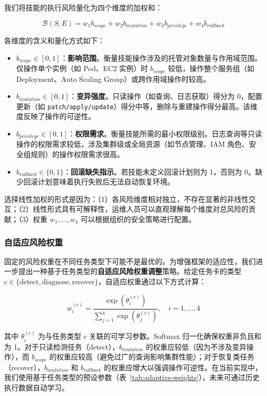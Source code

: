 \documentclass[11pt,a4paper]{ctexart}
\begin{document}
我们将技能的执行风险量化为四个维度的加权和：

\begin{equation}
\mathcal{B}(S, E) = w_1 b_{scope} + w_2 b_{mutation} + w_3 b_{privilege} + w_4 b_{rollback}
\end{equation}

\noindent 各维度的含义和量化方式如下：
\begin{itemize}[leftmargin=2em]
  \item $b_{scope} \in [0, 1]$：\textbf{影响范围}。衡量技能操作涉及的托管对象数量与作用域范围。仅操作单个实例（如 Pod、EC2 实例）时 $b_{scope}$ 较低，操作整个服务组（如 Deployment、Auto Scaling Group）或跨作用域操作时较高。
  \item $b_{mutation} \in [0, 1]$：\textbf{变异强度}。只读操作（如查询、日志获取）得分为 0，配置更新（如 \texttt{patch/apply/update}）得分中等，删除与重建操作得分最高。该维度反映了操作的可逆性。
  \item $b_{privilege} \in [0, 1]$：\textbf{权限需求}。衡量技能所需的最小权限级别。日志查询等只读操作的权限需求较低，涉及集群级或全局资源（如节点管理、IAM 角色、安全组规则）的操作权限需求很高。
  \item $b_{rollback} \in \{0, 1\}$：\textbf{回滚缺失指示}。若技能未定义回滚计划则为 1，否则为 0。缺少回滚计划意味着执行失败后无法自动恢复环境。
\end{itemize}

\noindent 选择线性加权的形式是因为：（1）各风险维度相对独立，不存在显著的非线性交互；（2）线性形式具有可解释性，运维人员可以直观理解每个维度对总风险的贡献；（3）权重 $w_1, \ldots, w_4$ 可以根据组织的安全策略进行配置。

\subsubsection{自适应风险权重}

固定的风险权重在不同任务类型下可能不是最优的。为增强框架的适应性，我们进一步提出一种基于任务类型的\textbf{自适应风险权重调整}策略。给定任务卡的类型 $c \in \{\text{detect}, \text{diagnose}, \text{recover}\}$，自适应权重通过以下方式计算：

\begin{equation}
w_i^{(c)} = \frac{\exp(\theta_i^{(c)})}{\sum_{j=1}^{4} \exp(\theta_j^{(c)})}, \quad i = 1, \ldots, 4
\end{equation}

\noindent 其中 $\theta_i^{(c)}$ 为与任务类型 $c$ 关联的可学习参数。Softmax 归一化确保权重非负且和为 1。对于只读检测任务（detect），$b_{mutation}$ 的权重应较低（因为不涉及变异操作），而 $b_{scope}$ 的权重应较高（避免过广的查询影响集群性能）；对于恢复类任务（recover），$b_{mutation}$ 和 $b_{rollback}$ 的权重应增大以强调操作可逆性。在当前实现中，我们使用基于任务类型的预设参数（表~\ref{tab:adaptive-weights}），未来可通过历史执行数据自动学习。
\end{document}
